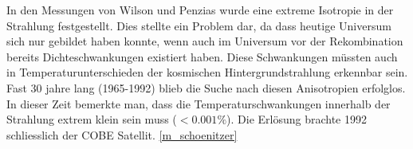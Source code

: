 In den Messungen von Wilson und Penzias wurde eine extreme Isotropie in der 
Strahlung festgestellt.
Dies stellte ein Problem dar, da dass heutige Universum sich nur gebildet haben 
konnte, wenn auch im Universum vor der Rekombination bereits Dichteschwankungen 
existiert haben.
Diese Schwankungen müssten auch in Temperaturunterschieden der kosmischen 
Hintergrundstrahlung erkennbar sein.
Fast 30 jahre lang (1965-1992) blieb die Suche nach diesen Anisotropien 
erfolglos.
In dieser Zeit bemerkte man, dass die Temperaturschwankungen innerhalb der 
Strahlung extrem klein sein muss ($< 0.001\%$).
Die Erlösung brachte 1992 schliesslich der COBE Satellit.
\ref{m_schoenitzer}